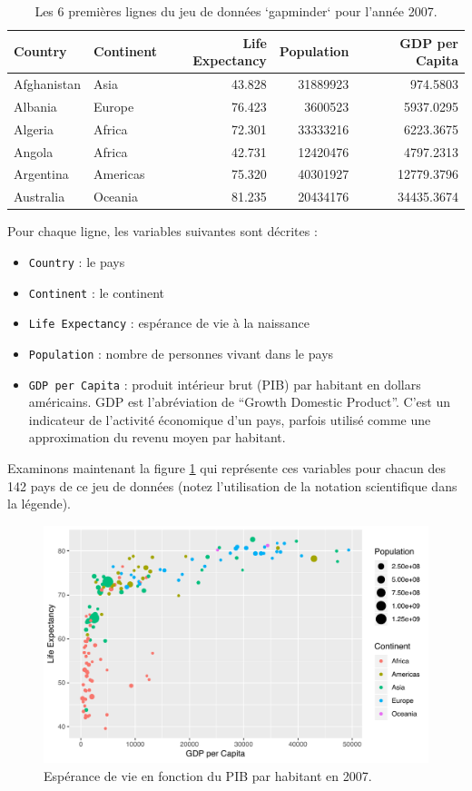 \documentclass[
  a4paper,
]{article}
\providecommand{\tightlist}{%
  \setlength{\itemsep}{0pt}\setlength{\parskip}{0pt}}
\begin{document}
\begin{longtable}[t]{llrrr}
\caption{\label{tab:unnamed-chunk-38}Les 6 premières lignes du jeu de données `gapminder` pour l'année 2007.}\\
\toprule
Country & Continent & Life Expectancy & Population & GDP per Capita\\
\midrule
Afghanistan & Asia & 43.828 & 31889923 & 974.5803\\
Albania & Europe & 76.423 & 3600523 & 5937.0295\\
Algeria & Africa & 72.301 & 33333216 & 6223.3675\\
Angola & Africa & 42.731 & 12420476 & 4797.2313\\
Argentina & Americas & 75.320 & 40301927 & 12779.3796\\
\addlinespace
Australia & Oceania & 81.235 & 20434176 & 34435.3674\\
\bottomrule
\end{longtable}

Pour chaque ligne, les variables suivantes sont décrites :

\begin{itemize}
\tightlist
\item
  \texttt{Country} : le pays
\item
  \texttt{Continent} : le continent
\item
  \texttt{Life\ Expectancy} : espérance de vie à la naissance
\item
  \texttt{Population} : nombre de personnes vivant dans le pays
\item
  \texttt{GDP\ per\ Capita} : produit intérieur brut (PIB) par habitant en dollars américains. GDP est l'abréviation de ``Growth Domestic Product''. C'est un indicateur de l'activité économique d'un pays, parfois utilisé comme une approximation du revenu moyen par habitant.
\end{itemize}

Examinons maintenant la figure \ref{fig:gapmind} qui représente ces variables pour chacun des 142 pays de ce jeu de données (notez l'utilisation de la notation scientifique dans la légende).

\begin{figure}[htpb]

{\centering \includegraphics[width=0.9\linewidth]{figure/gapmind-1} 

}

\caption{Espérance de vie en fonction du PIB par habitant en 2007.}\label{fig:gapmind}
\end{figure}
\end{document}
